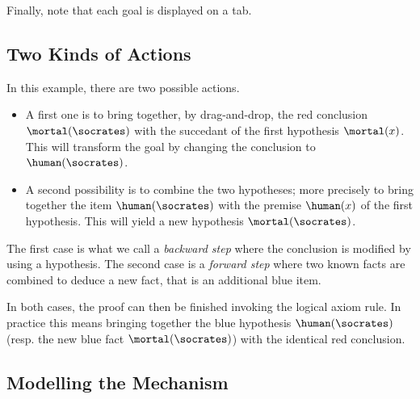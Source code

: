 Finally, note that each goal is displayed on a tab.

\subsection{Two Kinds of Actions}
In this example, there are two possible actions.

\begin{itemize}
\item A first one is to bring together, by drag-and-drop, the red conclusion
$\mortal(\socrates)$ with the succedant of the first hypothesis $\mortal(x)$.
This will transform the goal by changing the conclusion to $\human(\socrates)$.
\item A second possibility is to combine the two hypotheses; more precisely to
bring together the item $\human(\socrates)$ with the premise $\human(x)$ of the
first hypothesis. This will yield a new hypothesis $\mortal(\socrates)$.
\end{itemize}

The first case is what we call a {\em backward step} where the conclusion is
modified by using a hypothesis. The second case is a {\em forward step} where
two known facts are combined to deduce a new fact, that is an additional blue
item.

In both cases, the proof can then be finished invoking the logical
axiom rule. In practice this means bringing together the blue
hypothesis $\human(\socrates)$ (resp. the new blue fact
$\mortal(\socrates)$) with the identical red conclusion.


\subsection{Modelling the Mechanism}

